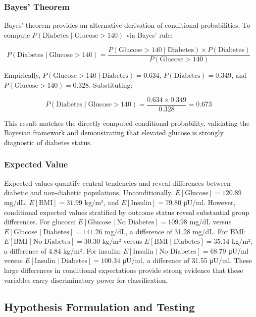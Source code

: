 \documentclass[12pt]{article}
\begin{document}
\subsubsection{Bayes' Theorem}

Bayes' theorem provides an alternative derivation of conditional probabilities. To compute $P(\text{Diabetes} \mid \text{Glucose} > 140)$ via Bayes' rule:

\[
P(\text{Diabetes} \mid \text{Glucose} > 140) = \frac{P(\text{Glucose} > 140 \mid \text{Diabetes}) \times P(\text{Diabetes})}{P(\text{Glucose} > 140)}
\]

Empirically, $P(\text{Glucose} > 140 \mid \text{Diabetes}) = 0.634$, $P(\text{Diabetes}) = 0.349$, and $P(\text{Glucose} > 140) = 0.328$. Substituting:

\[
P(\text{Diabetes} \mid \text{Glucose} > 140) = \frac{0.634 \times 0.349}{0.328} = 0.673
\]

This result matches the directly computed conditional probability, validating the Bayesian framework and demonstrating that elevated glucose is strongly diagnostic of diabetes status.

\subsubsection{Expected Value}

Expected values quantify central tendencies and reveal differences between diabetic and non-diabetic populations. Unconditionally, $E[\text{Glucose}] = 120.89$ mg/dL, $E[\text{BMI}] = 31.99$ kg/m², and $E[\text{Insulin}] = 79.80$ μU/ml. However, conditional expected values stratified by outcome status reveal substantial group differences. For glucose: $E[\text{Glucose} \mid \text{No Diabetes}] = 109.98$ mg/dL versus $E[\text{Glucose} \mid \text{Diabetes}] = 141.26$ mg/dL, a difference of 31.28 mg/dL. For BMI: $E[\text{BMI} \mid \text{No Diabetes}] = 30.30$ kg/m² versus $E[\text{BMI} \mid \text{Diabetes}] = 35.14$ kg/m², a difference of 4.84 kg/m². For insulin: $E[\text{Insulin} \mid \text{No Diabetes}] = 68.79$ μU/ml versus $E[\text{Insulin} \mid \text{Diabetes}] = 100.34$ μU/ml, a difference of 31.55 μU/ml. These large differences in conditional expectations provide strong evidence that these variables carry discriminatory power for classification.

\subsection{Hypothesis Formulation and Testing}
\end{document}
